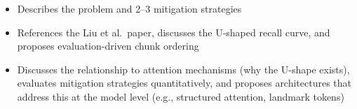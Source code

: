 \begin{interviewq}
\goodgreat
\begin{itemize}
    \item {} Describes the problem and 2--3 mitigation strategies
    \item {} References the Liu et al.\ paper, discusses the U-shaped
          recall curve, and proposes evaluation-driven chunk ordering
    \item {} Discusses the relationship to attention mechanisms
          (why the U-shape exists), evaluates mitigation strategies quantitatively,
          and proposes architectures that address this at the model level (e.g.,
          structured attention, landmark tokens)
\end{itemize}

\end{interviewq}

\bigskip

